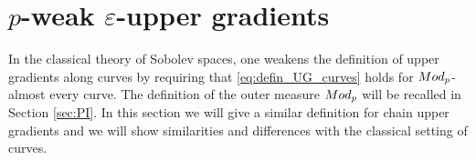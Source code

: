 \documentclass[12pt]{amsart}
\newcommand{\sfd}{{\sf d}}
\newcommand{\restr}[1]{\lower3pt\hbox{$|_{#1}$}}
\theoremstyle{definition}
\newcommand{\Mod}{\textup{Mod}}
\newcommand{\sfc}{{\sf c}}
\newcommand{\UG}[1]{{\rm UG}^{#1}}
\begin{document}



\section{$p$-weak $\varepsilon$-upper gradients}

\label{sec:weak_eps_upper_gradient}
In the classical theory of Sobolev spaces, one weakens the definition of upper gradients along curves by requiring that \eqref{eq:defin_UG_curves} holds for $\Mod_p$-almost every curve. The definition of the outer measure $\Mod_p$ will be recalled in Section \ref{sec:PI}. In this section we will give a similar definition for chain upper gradients and we will show similarities and differences with the classical setting of curves.
\end{document}
